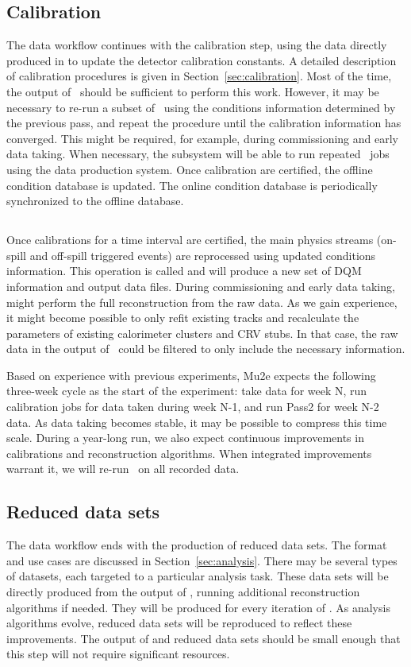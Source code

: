 \subsection{Calibration}
The data workflow continues with the calibration step, using the data directly produced in \passone to update the detector calibration constants. A detailed description of calibration procedures is given in Section~\ref{sec:calibration}. Most of the time, the output of \passone\ should be sufficient to perform this work. However, it may be necessary to re-run a subset of \passone\ using the conditions information determined by the previous pass, and repeat the procedure until the calibration information has converged. This might be required, for example, during commissioning and early data taking. When necessary, the subsystem will be able to run repeated \passone\ jobs using the data production system. Once calibration are certified, the offline condition database is updated. The online condition database is periodically synchronized to the offline database.


\subsection{\passtwo}
Once calibrations for a time interval are certified, the main physics streams (on-spill and off-spill triggered events) are reprocessed using updated conditions information. This operation is called \passtwo and will produce a new set of DQM information and output data files. During commissioning and early data taking, \passtwo might perform the full reconstruction from the raw data. As we gain experience, it might become possible to only refit existing tracks and recalculate the parameters of existing calorimeter clusters and CRV stubs. In that case, the raw data in the output of \passone\ could be filtered to only include the necessary information.

Based on experience with previous experiments, Mu2e expects the following three-week cycle as the start of the experiment: take data for week N, run calibration jobs for data taken during week N-1, and run Pass2 for week N-2 data. As data taking becomes stable, it may be possible to compress this time scale. During a year-long run, we also expect continuous improvements in calibrations and reconstruction algorithms. When integrated improvements warrant it, we will re-run \passtwo\ on all recorded data.


\subsection{Reduced data sets}
The data workflow ends with the production of reduced data sets. The format and use cases are discussed in Section~\ref{sec:analysis}. There may be several types of datasets, each targeted to a particular analysis task. These data sets will be directly produced from the output of \passtwo, running additional reconstruction algorithms if needed. They will be produced for every iteration of \passtwo. As analysis algorithms evolve, reduced data sets will be reproduced to reflect these improvements. The output of \passtwo and reduced data sets should be small enough that this step will not require significant resources.

